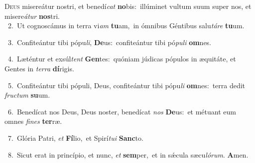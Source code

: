 \lettrine{\initial\textcolor{\initialcolor}{D}}{eus} misereátur nostri, et benedí\textit{cat} \textbf{no}\-bis:~\star illúminet vultum suum super nos, et misere\-\textit{á}\-\textit{tur} \textbf{nos}\-tri.\\
{\numbfont\textcolor{\numbcolor}{~2.}}~Ut cognoscámus in terra vi\textit{am} \textbf{tu}\-am,~\star in ómnibus Géntibus salu\-\textit{tá}\-\textit{re} \textbf{tu}\-um.\par
{\numbfont\textcolor{\numbcolor}{~3.}}~Confiteántur tibi pópu\-\textit{li}\-, \textbf{De}\-us:~\star confiteántur tibi pó\-\textit{pu}\-\textit{li} \textbf{om}\-nes.\par
{\numbfont\textcolor{\numbcolor}{~4.}}~Læténtur et exsúl\textit{tent} \textbf{Gen}\-tes:~\star quóniam júdicas pópulos in æquitáte, et Gentes in \textit{ter}\-\textit{ra} \textbf{dí}\-rigis.\par
{\numbfont\textcolor{\numbcolor}{~5.}}~Confiteántur tibi pópuli, Deus, confiteántur tibi pópu\textit{li} \textbf{om}\-nes:~\star terra dedit \textit{fruc}\-\textit{tum} \textbf{su}\-um.\par
{\numbfont\textcolor{\numbcolor}{~6.}}~Benedícat nos Deus, Deus noster, benedícat \textit{nos} \textbf{De}\-us:~\star et métuant eum omnes \textit{fi}\-\textit{nes} \textbf{ter}\-ræ.\par
{\numbfont\textcolor{\numbcolor}{~7.}}~Glória Patri, \textit{et} \textbf{Fí}\-lio,~\star et Spirí\-\textit{tu}\-\textit{i} \textbf{Sanc}\-to.\par
{\numbfont\textcolor{\numbcolor}{~8.}}~Sicut erat in princípio, et nunc, \textit{et} \textbf{sem}\-per,~\star et in sǽcula sæcu\-\textit{ló}\-\textit{rum}. \textbf{A}\-men.\par
